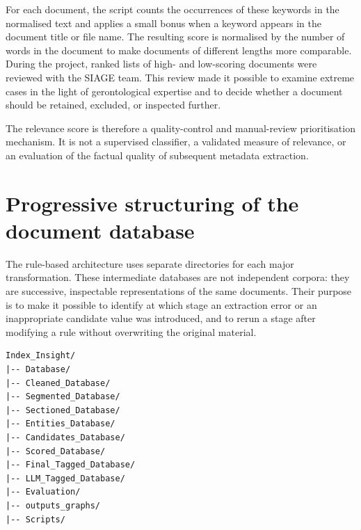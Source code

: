 
For each document, the script counts the occurrences of these keywords in the
normalised text and applies a small bonus when a keyword appears in the document
title or file name. The resulting score is normalised by the number of words in the
document to make documents of different lengths more comparable. During the
project, ranked lists of high- and low-scoring documents were reviewed with the
SIAGE team. This review made it possible to examine extreme cases in the light of
gerontological expertise and to decide whether a document should be retained,
excluded, or inspected further.

The relevance score is therefore a quality-control and manual-review
prioritisation mechanism. It is not a supervised classifier, a validated measure of
relevance, or an evaluation of the factual quality of subsequent metadata
extraction.


\section{Progressive structuring of the document database}

The rule-based architecture uses separate directories for each major
transformation. These intermediate databases are not independent corpora: they are
successive, inspectable representations of the same documents. Their purpose is to
make it possible to identify at which stage an extraction error or an inappropriate
candidate value was introduced, and to rerun a stage after modifying a rule without
overwriting the original material.

\begin{verbatim}
Index_Insight/
|-- Database/
|-- Cleaned_Database/
|-- Segmented_Database/
|-- Sectioned_Database/
|-- Entities_Database/
|-- Candidates_Database/
|-- Scored_Database/
|-- Final_Tagged_Database/
|-- LLM_Tagged_Database/
|-- Evaluation/
|-- outputs_graphs/
|-- Scripts/
\end{verbatim}

